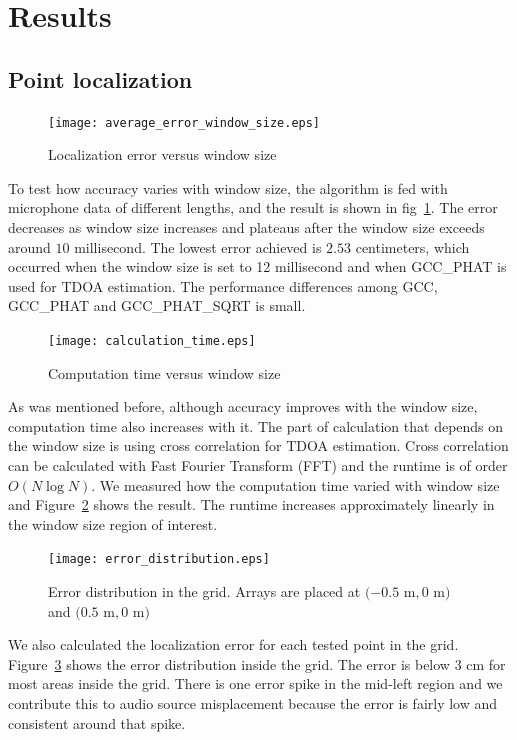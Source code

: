 \section{Results}
\subsection{Point localization}
\begin{figure}[h!]
\centering
\texttt{[image: average\_error\_window\_size.eps]}
\caption{Localization error versus window size}
\label{fig:accuracy_vs_window}
\end{figure}
To test how accuracy varies with window size, the algorithm is fed with microphone data of different lengths, and the result is shown in fig~\ref{fig:accuracy_vs_window}. The error decreases as window size increases and plateaus after the window size exceeds around $10$ millisecond. The lowest error achieved is $2.53$ centimeters, which occurred when the window size is set to 12 millisecond and when GCC\_PHAT is used for TDOA estimation. The performance differences among GCC, GCC\_PHAT and GCC\_PHAT\_SQRT is small.

\begin{figure}[h!]
\centering
\texttt{[image: calculation\_time.eps]}
\caption{Computation time versus window size}
\label{fig:speed_vs_window}
\end{figure}
As was mentioned before, although accuracy improves with the window size, computation time also increases with it. The part of calculation that depends on the window size is using cross correlation for TDOA estimation. Cross correlation can be calculated with Fast Fourier Transform (FFT) and the runtime is of order $O(N\log N)$. We measured how the computation time varied with window size and Figure~\ref{fig:speed_vs_window} shows the result. The runtime increases approximately linearly in the window size region of interest.

\begin{figure}[h!]
\centering
\texttt{[image: error\_distribution.eps]}
\caption{Error distribution in the grid. Arrays are placed at $(-0.5$ m$, 0$ m$)$ and $(0.5$ m$, 0$ m$)$}
\label{fig:error_distribution}
\end{figure}
We also calculated the localization error for each tested point in the grid. Figure~\ref{fig:error_distribution} shows the error distribution inside the grid. The error is below $3$ cm for most areas inside the grid. There is one error spike in the mid-left region and we contribute this to audio source misplacement because the error is fairly low and consistent around that spike.

